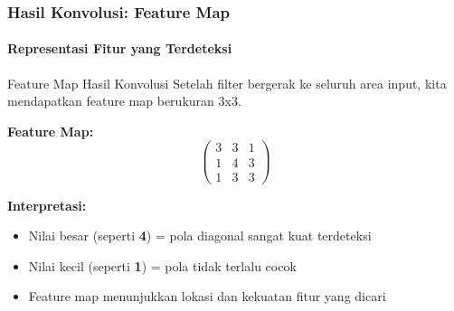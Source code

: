 \documentclass[t,aspectratio=169,xcolor=dvipsnames]{beamer}
\begin{document}
\begin{frame}
    \frametitle{Hasil Konvolusi: Feature Map}
    \framesubtitle{Representasi Fitur yang Terdeteksi}
    \small

    \begin{block}{Feature Map Hasil Konvolusi}
        Setelah filter bergerak ke seluruh area input, kita mendapatkan feature map berukuran 3x3.
    \end{block}

    \begin{center}
        \textbf{Feature Map:}
        $$
        \begin{pmatrix}
        3 & 3 & 1 \\
        1 & 4 & 3 \\
        1 & 3 & 3
        \end{pmatrix}
        $$
    \end{center}

    \textbf{Interpretasi:}
    \begin{itemize}
        \item Nilai besar (seperti \textbf{4}) = pola diagonal sangat kuat terdeteksi
        \item Nilai kecil (seperti \textbf{1}) = pola tidak terlalu cocok
        \item Feature map menunjukkan lokasi dan kekuatan fitur yang dicari
    \end{itemize}

\end{frame}
\end{document}
